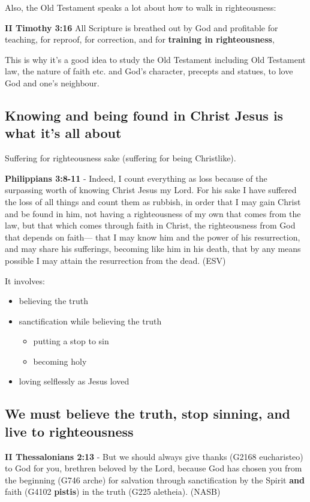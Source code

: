 \documentclass[11pt]{article}
\begin{document}
Also, the Old Testament speaks a lot about how to walk in righteousness:

\textbf{II Timothy 3:16} All Scripture is breathed out by God and profitable for teaching, for reproof, for correction, and for \textbf{training in righteousness},

This is why it's a good idea to study the Old Testament including Old Testament law, the nature of faith etc. and God's character, precepts and statues, to love God and one's neighbour.

\subsection{Knowing and being found in Christ Jesus is what it's all about}
\label{sec:org9d099da}
Suffering for righteousness sake (suffering for being Christlike).

\textbf{Philippians 3:8-11} - Indeed, I count everything as loss because of the surpassing worth of knowing Christ Jesus my Lord. For his sake I have suffered the loss of all things and count them as rubbish, in order that I may gain Christ and be found in him, not having a righteousness of my own that comes from the law, but that which comes through faith in Christ, the righteousness from God that depends on faith— that I may know him and the power of his resurrection, and may share his sufferings, becoming like him in his death, that by any means possible I may attain the resurrection from the dead. (ESV)

It involves:
\begin{itemize}
\item believing the truth
\item sanctification while believing the truth
\begin{itemize}
\item putting a stop to sin
\item becoming holy
\end{itemize}
\item loving selflessly as Jesus loved
\end{itemize}

\subsection{We must believe the truth, stop sinning, and live to righteousness}
\label{sec:orgc7066ca}
\textbf{II Thessalonians 2:13} - But we should always give thanks (G2168 eucharisteo) to God for you, brethren beloved by the Lord, because God has chosen you from the beginning (G746 arche) for salvation through sanctification by the Spirit \textbf{and} faith (G4102 \textbf{pistis}) in the truth (G225 aletheia). (NASB)
\end{document}
